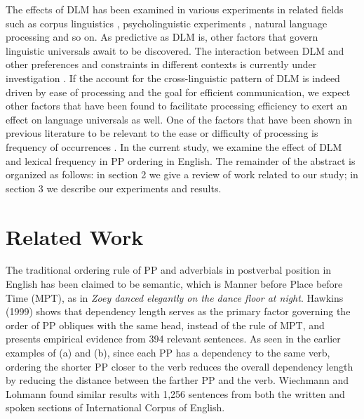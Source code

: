 \documentclass[11pt,letterpaper]{article}
\begin{document}
The effects of DLM has been examined in various experiments in related fields such as corpus linguistics \cite{temperley2007minimization}, psycholinguistic experiments \cite{yamashita2001long}, natural language processing \cite{gildea2007optimizing} and so on. As predictive as DLM is, other factors that govern linguistic universals await to be discovered. The interaction between DLM and other preferences and constraints in different contexts is currently under investigation \cite{gulordava2015dependency, wiechmann2013domain}. If the account for the cross-linguistic pattern of DLM is indeed driven by ease of processing and the goal for efficient communication, we expect other factors that have been found to facilitate processing efficiency to exert an effect on language universals as well. One of the factors that have been shown in previous literature to be relevant to the ease or difficulty of processing is frequency of occurrences \cite{hawkins2014cross}. In the current study, we examine the effect of DLM and lexical frequency in PP ordering in English. The remainder of the abstract is organized as follows: in section 2 we give a review of work related to our study; in section 3 we describe our experiments and results.

\section{Related Work}

The traditional ordering rule of PP and adverbials in postverbal position in English has been claimed to be semantic, which is Manner before Place before Time (MPT), as in \textit{Zoey danced elegantly on the dance floor at night}. Hawkins (1999) shows that dependency length serves as the primary factor governing the order of PP obliques with the same head, instead of the rule of MPT, and presents empirical evidence from 394 relevant sentences. As seen in the earlier examples of (a) and (b), since each PP has a dependency to the same verb, ordering the shorter PP closer to the verb reduces the overall dependency length by reducing the distance between the farther PP and the verb. Wiechmann and Lohmann  found similar results with 1,256 sentences from both the written and spoken sections of International Corpus of English.
\end{document}
